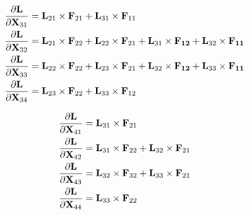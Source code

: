 \begin{align}
  \frac{\partial \bold{L}}{\partial \bold{X}_{31}} &= \bold{L}_{21}\times \bold{F}_{21} + \bold{L}_{31}\times \bold{F}_{11} \\
  \frac{\partial \bold{L}}{\partial \bold{X}_{32}} &= \bold{L}_{21}\times \bold{F}_{22} + \bold{L}_{22}\times \bold{F}_{21} + \bold{L}_{31}\times \bold{F_{12}} + \bold{L}_{32}\times \bold{F_{11}}\\
  \frac{\partial \bold{L}}{\partial \bold{X}_{33}} &= \bold{L}_{22}\times \bold{F}_{22} + \bold{L}_{23}\times \bold{F}_{21} + \bold{L}_{32}\times \bold{F_{12}} + \bold{L}_{33}\times \bold{F_{11}}\\
  \frac{\partial \bold{L}}{\partial \bold{X}_{34}} &= \bold{L}_{23}\times \bold{F}_{22} + \bold{L}_{33}\times \bold{F}_{12}\\
\end{align}

\begin{align}
  \frac{\partial \bold{L}}{\partial \bold{X}_{41}} &= \bold{L}_{31}\times \bold{F}_{21} \\
  \frac{\partial \bold{L}}{\partial \bold{X}_{42}} &= \bold{L}_{31}\times \bold{F}_{22} +  \bold{L}_{32}\times \bold{F}_{21}\\
  \frac{\partial \bold{L}}{\partial \bold{X}_{43}} &= \bold{L}_{32}\times \bold{F}_{32} +  \bold{L}_{33}\times \bold{F}_{21}\\
  \frac{\partial \bold{L}}{\partial \bold{X}_{44}} &= \bold{L}_{33}\times \bold{F}_{22}
\end{align}



